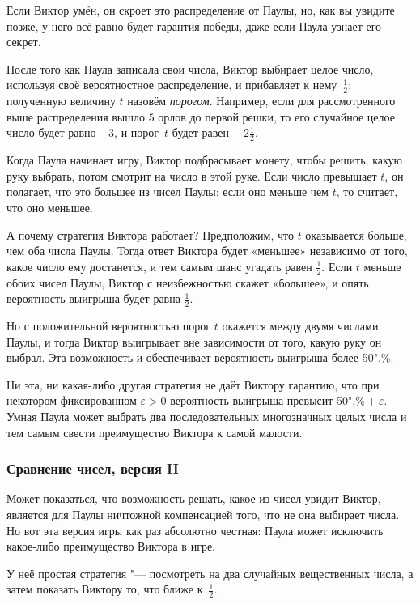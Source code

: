 \documentclass[twoside]{book}
\begin{document}
Если Виктор умён, он скроет это распределение от Паулы, но, как вы увидите позже, у него всё равно будет гарантия победы, даже если Паула узнает его секрет.

После того как Паула записала свои числа, Виктор выбирает целое число, используя своё вероятностное распределение, и прибавляет к нему~$\tfrac12$;
полученную величину $t$ назовём \emph{порогом}.
Например, если для рассмотренного выше распределения вышло $5$ орлов до первой решки, то его случайное целое число будет равно $-3$, и порог~$t$ будет равен~$-2 \tfrac12$.


Когда Паула начинает игру, Виктор подбрасывает монету, чтобы решить, какую руку выбрать, потом смотрит на число в этой руке.
Если число превышает $t$, он полагает, что это большее из чисел Паулы; если оно меньше чем $t$, то считает, что оно меньшее.

А почему стратегия Виктора работает? 
Предположим, что $t$ оказывается больше, чем оба числа Паулы.
Тогда ответ Виктора будет «меньшее» независимо от того, какое число
ему достанется, и тем самым шанс угадать равен $\tfrac12$.
Если $t$ меньше обоих чисел Паулы, Виктор с неизбежностью скажет «большее», и опять вероятность выигрыша будет равна $\tfrac12$.

Но с положительной вероятностью порог $t$ окажется между двумя числами Паулы, и тогда Виктор выигрывает вне зависимости от того, какую руку он выбрал.
Эта возможность и обеспечивает вероятность выигрыша более 50",\%.\heart

\medskip

Ни эта, ни какая-либо другая стратегия не даёт Виктору гарантию, что при некотором фиксированном $\varepsilon>0$ вероятность выигрыша превысит 50",\%${}+\varepsilon$.
Умная Паула может выбрать два последовательных многозначных целых числа и тем самым свести преимущество Виктора к самой малости.

\subsubsection*{Сравнение чисел, версия II}%

Может показаться, что возможность решать, какое из чисел увидит Виктор, является для Паулы ничтожной компенсацией того, что не она выбирает числа.
Но вот эта версия игры как раз абсолютно честная:
Паула может исключить какое-либо преимущество Виктора в игре.

У неё простая стратегия "--- посмотреть на два случайных вещественных числа, а затем показать Виктору то, что ближе к~$\tfrac12$.
\end{document}
